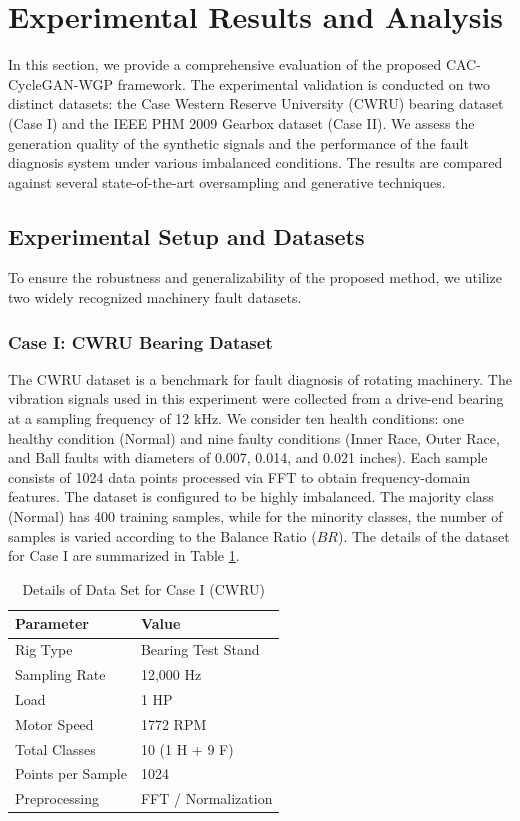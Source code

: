 \section{Experimental Results and Analysis}
\label{sec:experiments}

In this section, we provide a comprehensive evaluation of the proposed CAC-CycleGAN-WGP framework. The experimental validation is conducted on two distinct datasets: the Case Western Reserve University (CWRU) bearing dataset (Case I) and the IEEE PHM 2009 Gearbox dataset (Case II). We assess the generation quality of the synthetic signals and the performance of the fault diagnosis system under various imbalanced conditions. The results are compared against several state-of-the-art oversampling and generative techniques.

\subsection{Experimental Setup and Datasets}
To ensure the robustness and generalizability of the proposed method, we utilize two widely recognized machinery fault datasets.

\subsubsection{Case I: CWRU Bearing Dataset}
The CWRU dataset is a benchmark for fault diagnosis of rotating machinery. The vibration signals used in this experiment were collected from a drive-end bearing at a sampling frequency of 12 kHz. We consider ten health conditions: one healthy condition (Normal) and nine faulty conditions (Inner Race, Outer Race, and Ball faults with diameters of 0.007, 0.014, and 0.021 inches). Each sample consists of 1024 data points processed via FFT to obtain frequency-domain features. The dataset is configured to be highly imbalanced. The majority class (Normal) has 400 training samples, while for the minority classes, the number of samples is varied according to the Balance Ratio ($BR$). The details of the dataset for Case I are summarized in Table \ref{tab:case1_details}.

\begin{table}[htbp]
\centering
\caption{Details of Data Set for Case I (CWRU)}
\label{tab:case1_details}
\begin{tabular}{ll}
\hline
\textbf{Parameter} & \textbf{Value} \\ \hline
Rig Type & Bearing Test Stand \\
Sampling Rate & 12,000 Hz \\
Load & 1 HP \\
Motor Speed & 1772 RPM \\
Total Classes & 10 (1 H + 9 F) \\
Points per Sample & 1024 \\
Preprocessing & FFT / Normalization \\
\hline
\end{tabular}
\end{table}

